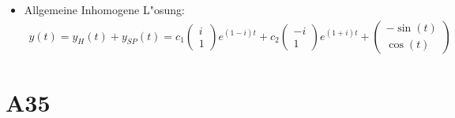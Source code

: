 \documentclass[fleqn,12pt]{scrartcl}
\begin{document}
\begin{itemize}
\item
	Allgemeine Inhomogene L"osung:
	\begin{align*}
		y(t) = y_H(t) + y_{SP}(t) = 
	c_1\begin{pmatrix}i\\1\end{pmatrix}e^{(1-i)t} + c_2\begin{pmatrix}-i\\1\end{pmatrix}e^{(1+i)t} + \begin{pmatrix} -\sin(t)\\ \cos(t) \end{pmatrix}
	\end{align*}

\end{itemize}


\section*{A35}
\end{document}
